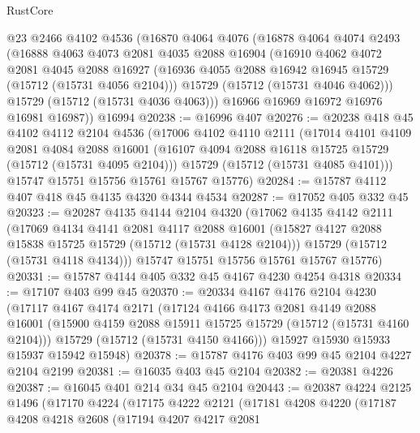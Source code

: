 \begin{lexlean}{RustCore}
\begin{coremodule}
    @23
    @2466
    @4102
    @4536
    (@16870
      @4064
      @4076
      (@16878
        @4064
        @4074
        @2493
        (@16888
          @4063
          @4073
          @2081
          @4035
          @2088
          @16904
          (@16910
            @4062
            @4072
            @2081
            @4045
            @2088
            @16927
            (@16936 @4055 @2088 @16942 @16945 @15729 (@15712 (@15731 @4056 @2104)))
            @15729
            (@15712 (@15731 @4046 @4062)))
          @15729
          (@15712 (@15731 @4036 @4063)))
        @16966
        @16969
        @16972
        @16976
        @16981
        @16987))
    @16994
@20238 := @16996 @407
@20276 := @20238
    @418
    @45
    @4102
    @4112
    @2104
    @4536
    (@17006
      @4102
      @4110
      @2111
      (@17014
        @4101
        @4109
        @2081
        @4084
        @2088
        @16001
        (@16107 @4094 @2088 @16118 @15725 @15729 (@15712 (@15731 @4095 @2104)))
        @15729
        (@15712 (@15731 @4085 @4101)))
      @15747
      @15751
      @15756
      @15761
      @15767
      @15776)
@20284 := @15787 @4112 @407 @418 @45 @4135 @4320 @4344 @4534
@20287 := @17052 @405 @332 @45
@20323 := @20287
    @4135
    @4144
    @2104
    @4320
    (@17062
      @4135
      @4142
      @2111
      (@17069
        @4134
        @4141
        @2081
        @4117
        @2088
        @16001
        (@15827 @4127 @2088 @15838 @15725 @15729 (@15712 (@15731 @4128 @2104)))
        @15729
        (@15712 (@15731 @4118 @4134)))
      @15747
      @15751
      @15756
      @15761
      @15767
      @15776)
@20331 := @15787 @4144 @405 @332 @45 @4167 @4230 @4254 @4318
@20334 := @17107 @403 @99 @45
@20370 := @20334
    @4167
    @4176
    @2104
    @4230
    (@17117
      @4167
      @4174
      @2171
      (@17124
        @4166
        @4173
        @2081
        @4149
        @2088
        @16001
        (@15900 @4159 @2088 @15911 @15725 @15729 (@15712 (@15731 @4160 @2104)))
        @15729
        (@15712 (@15731 @4150 @4166)))
      @15927
      @15930
      @15933
      @15937
      @15942
      @15948)
@20378 := @15787 @4176 @403 @99 @45 @2104 @4227 @2104 @2199
@20381 := @16035 @403 @45 @2104
@20382 := @20381 @4226
@20387 := @16045 @401 @214 @34 @45 @2104
@20443 := @20387
    @4224
    @2125
    @1496
    (@17170
      @4224
      (@17175
        @4222
        @2121
        (@17181
          @4208
          @4220
          (@17187
            @4208
            @4218
            @2608
            (@17194
              @4207
              @4217
              @2081

\end{coremodule}
\end{lexlean}
